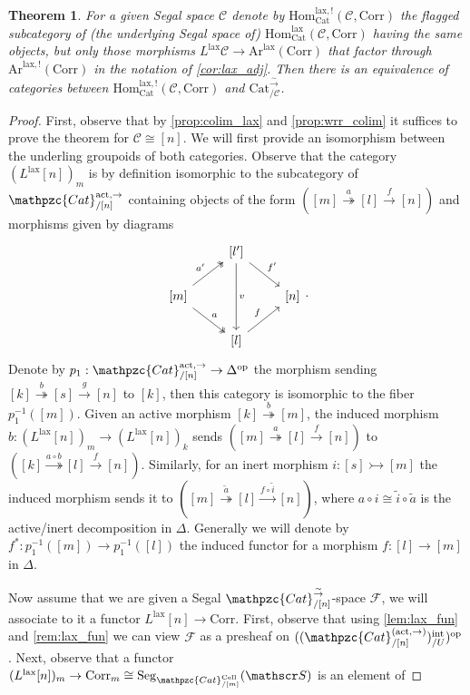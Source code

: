 \documentclass[a4paper, reqno]{amsart}
\newtheorem{theorem}{Theorem}[section]
\theoremstyle{definition}
\newcommand\cC{\mathscr C}
\newcommand\cF{\mathscr F}
\newcommand\cS{\mathscr S}
\newcommand\mor{\mathrm{Hom}}
\newcommand\op{\mathrm{op}}
\newcommand\cat{\mathrm{Cat}}
\newcommand\ccat{\mathpzc{Cat}}
\newcommand\arr{\mathrm{Ar}}
\newcommand\corr{\mathrm{Corr}}
\newcommand\cell{\mathrm{Cell}}
\newcommand\lax{\mathrm{lax}}
\newcommand\wrr{{\overset{\sim}{\rightarrow}}}
\newcommand\act{\mathrm{act}}
\newcommand\inrt{\mathrm{int}}
\newcommand\seg{\mathrm{Seg}}
\begin{document}
\begin{theorem}\label{thm:lax_corr}
For a given Segal space $\cC$ denote by $\mor^{\lax,!}_\cat(\cC,\corr)$ the flagged subcategory of (the underlying Segal space of) $\mor^\lax_\cat(\cC,\corr)$ having the same objects, but only those morphisms $L^\lax\cC\rightarrow\arr^\lax(\corr)$ that factor through $\arr^{\lax,!}(\corr)$ in the notation of \cref{cor:lax_adj}. Then there is an equivalence of categories between $\mor^{\lax,!}_\cat(\cC,\corr)$ and $\cat^\wrr_{/\cC}$.
\end{theorem}
\begin{proof}
First, observe that by \cref{prop:colim_lax} and \cref{prop:wrr_colim} it suffices to prove the theorem for $\cC\cong[n]$. We will first provide an isomorphism between the underling groupoids of both categories. Observe that the category $(L^\lax[n])_m$ is by definition isomorphic to the  subcategory of $\ccat^{\act,\rightarrow}_{/[n]}$ containing objects of the form $([m]\overset{a}{\twoheadrightarrow}[l]\xrightarrow{f}[n])$ and morphisms given by diagrams
\[
\begin{tikzcd}
{}&{[l']}\arrow[dd, "v"]\arrow[dr, "f'"]\\
{[m]}\arrow[ur, two heads, "a'"]\arrow[dr, two heads,  "a"]&{}&{[n]}\\
{}&{[l]}\arrow[ur, "f"]
\end{tikzcd}.
\]
Denote by $p_1:\ccat_{/[n]}^{\act,\rightarrow}\rightarrow\Delta^\op$ the morphism sending $[k]\overset{b}{\twoheadrightarrow}[s]\xrightarrow{g}[n]$ to $[k]$, then this category is isomorphic to the fiber $p_1^{-1}([m])$. Given an active morphism $[k]\overset{b}{\twoheadrightarrow}[m]$, the induced morphism $b:(L^\lax[n])_m\rightarrow(L^\lax[n])_k$ sends $([m]\overset{a}{\twoheadrightarrow}[l]\xrightarrow{f}[n])$ to $([k]\overset{a\circ b}{\twoheadrightarrow}[l]\xrightarrow{f}[n])$. Similarly, for an inert morphism $i:[s]\rightarrowtail[m]$ the induced morphism sends it to $([m]\overset{\widetilde{a}}{\twoheadrightarrow}[l]\xrightarrow{f\circ \widetilde{i}}[n])$, where $a\circ i\cong \widetilde{i}\circ \widetilde{a}$ is the active/inert decomposition in $\Delta$. Generally we will denote by $f^*:p_1^{-1}([m])\rightarrow p_1^{-1}([l])$ the induced functor for a morphism $f:[l]\rightarrow[m]$ in $\Delta$.\par
Now assume that we are given a Segal $\ccat^\wrr_{/[n]}$-space $\cF$, we will associate to it a functor $L^\lax[n]\rightarrow\corr$. First, observe that using  \cref{lem:lax_fun} and \cref{rem:lax_fun} we can view $\cF$ as a presheaf on $((\ccat^{(\act,\rightarrow)}_{/[n]})^\inrt_{/U})^\op$. Next, observe that a functor $(L^\lax[n])_m\rightarrow\corr_m\cong\seg_{\ccat^\cell_{/[m]}}(\cS)$ is an element of  

\end{proof}
\end{document}
